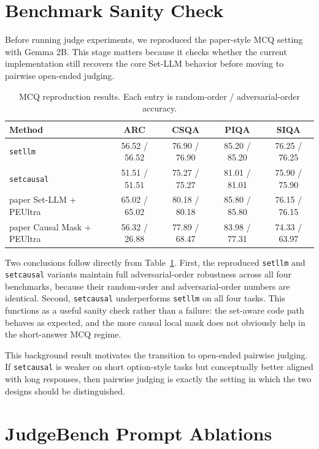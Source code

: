 \documentclass{article}
\begin{document}
\section{Benchmark Sanity Check}

Before running judge experiments, we reproduced the paper-style MCQ setting with Gemma 2B. This stage matters because it checks whether the current implementation still recovers the core Set-LLM behavior before moving to pairwise open-ended judging.

\begin{table}[t]
\centering
\small
\begin{tabular}{lcccc}
\toprule
Method & ARC & CSQA & PIQA & SIQA \\
\midrule
\texttt{setllm} & 56.52 / 56.52 & 76.90 / 76.90 & 85.20 / 85.20 & 76.25 / 76.25 \\
\texttt{setcausal} & 51.51 / 51.51 & 75.27 / 75.27 & 81.01 / 81.01 & 75.90 / 75.90 \\
paper Set-LLM + PEUltra & 65.02 / 65.02 & 80.18 / 80.18 & 85.80 / 85.80 & 76.15 / 76.15 \\
paper Causal Mask + PEUltra & 56.32 / 26.88 & 77.89 / 68.47 & 83.98 / 77.31 & 74.33 / 63.97 \\
\bottomrule
\end{tabular}
\caption{MCQ reproduction results. Each entry is random-order / adversarial-order accuracy.}
\label{tab:mcq}
\end{table}

Two conclusions follow directly from Table~\ref{tab:mcq}. First, the reproduced \texttt{setllm} and \texttt{setcausal} variants maintain full adversarial-order robustness across all four benchmarks, because their random-order and adversarial-order numbers are identical. Second, \texttt{setcausal} underperforms \texttt{setllm} on all four tasks. This functions as a useful sanity check rather than a failure: the set-aware code path behaves as expected, and the more causal local mask does not obviously help in the short-answer MCQ regime.

This background result motivates the transition to open-ended pairwise judging. If \texttt{setcausal} is weaker on short option-style tasks but conceptually better aligned with long responses, then pairwise judging is exactly the setting in which the two designs should be distinguished.

\section{JudgeBench Prompt Ablations}
\end{document}
